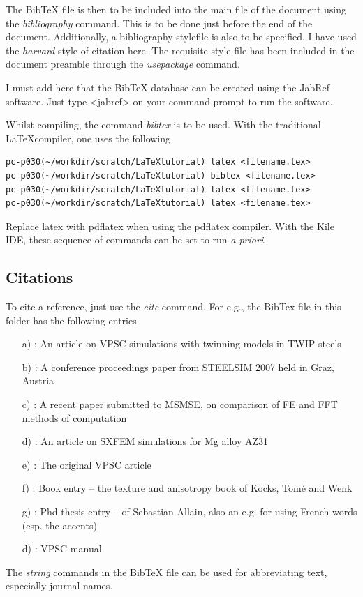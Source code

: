 \documentclass[a4paper,12pt,times]{article} %
\begin{document}
The BibTeX file is then to be included into the main file of the document using the \emph{bibliography} command. This is to be done just before the end of the document. Additionally, a bibliography stylefile is also to be specified. I have used the \emph{harvard} style of citation here. The requisite style file has been included in the document preamble through the \emph{usepackage} command.

I must add here that the BibTeX database can be created using the JabRef software. Just type <jabref> on your command prompt to run the software.

Whilst compiling, the command \emph{bibtex} is to be used. With the traditional \LaTeX compiler, one uses the following
\begin{verbatim}
pc-p030(~/workdir/scratch/LaTeXtutorial) latex <filename.tex>
pc-p030(~/workdir/scratch/LaTeXtutorial) bibtex <filename.tex>
pc-p030(~/workdir/scratch/LaTeXtutorial) latex <filename.tex>
pc-p030(~/workdir/scratch/LaTeXtutorial) latex <filename.tex>
\end{verbatim}
Replace latex with pdflatex when using the pdflatex compiler. With the Kile IDE, these sequence of commands can be set to run \emph{a-priori}.

\subsection{Citations}
To cite a reference, just use the \emph{cite} command. For e.g., the BibTex file in this folder has the following entries
\begin{enumerate}
 \item[a)] \cite{prakash.etal.2008a}: An article on VPSC simulations with twinning models in TWIP steels
 \item[b)] \cite{prakash.etal.2007}: A conference proceedings paper from STEELSIM 2007 held in Graz, Austria
 \item[c)] \cite{prakash.lebensohn.2009}: A recent paper submitted to MSMSE, on comparison of FE and FFT methods of computation
 \item[d)] \cite{prakash.etal.2009}: An article on SXFEM simulations for Mg alloy AZ31
 \item[e)] \cite{lebensohn.tome.1993}: The original VPSC article
 \item[f)] \cite{kocks.etal.1998}: Book entry -- the texture and anisotropy book of Kocks, Tom\'e and Wenk
 \item[g)] \cite{allain.2004}: Phd thesis entry -- of Sebastian Allain, also an e.g. for using French words (esp. the accents)
 \item[d)] \cite{tome.lebensohn.2003a}: VPSC manual
\end{enumerate}
The \emph{string} commands in the BibTeX file can be used for abbreviating text, especially journal names.
\end{document}

